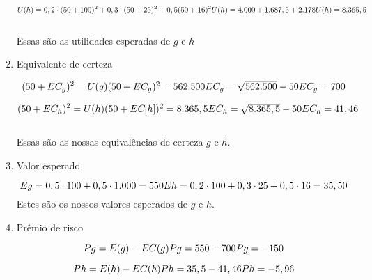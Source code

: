 \begin{flushleft}
\begin{enumerate}
	\begin{equation}
	U(h) = 0,2 \cdot (50 + 100)^{2} + 0,3 \cdot(50 + 25)^{2} + 0,5(50 + 16)^{2}
	$$\\$$
	U(h) = 4.000 + 1.687,5 + 2.178
	$$\\$$
	U(h) = 8.365,5
	\end{equation}
	\\ Essas são as utilidades esperadas de $g$ e $h$
	
	\item Equivalente de certeza
	
	\begin{equation}
	(50 + EC_{g})^{2} = U(g)
	$$\\$$
	(50 + EC_{g})^{2} = 562.500
	$$\\$$
	EC_{g} = \sqrt{562.500} - 50
	$$\\$$
	EC_{g} = 700
	\end{equation}
	
	\begin{equation}
	(50 + EC_{h})^{2} = U(h)
	$$\\$$
	(50 + EC_[h])^{2} = 8.365,5
	$$\\$$
	EC_{h} = \sqrt{8.365,5} - 50
	$$\\$$
	EC_{h} = 41,46
	\end{equation}
	\\ Essas são as nossas equivalências de certeza $g$ e $h$.
	
	\item Valor esperado
	
	\begin{equation}
	Eg = 0,5 \cdot 100 + 0,5 \cdot 1.000 = 550
	$$\\$$
	Eh = 0,2 \cdot 100 + 0,3 \cdot 25 + 0,5 \cdot 16 = 35,50
	\end{equation}
	Estes são os nossos valores esperados de $g$ e $h$.
	
	\item Prêmio de risco
	
	\begin{equation}
	Pg = E(g) - EC(g)
	$$\\$$
	Pg = 550 - 700
	$$\\$$
	Pg = -150
	\end{equation}
	
	\begin{equation}
	Ph = E(h) - EC(h)
	$$\\$$
	Ph = 35,5 - 41,46
	$$\\$$
	Ph = -5,96
	\end{equation}
	

\end{enumerate}
\end{flushleft}
